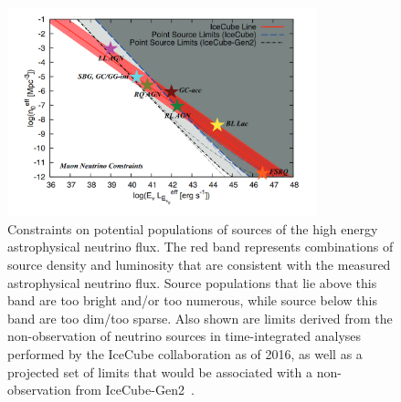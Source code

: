 \begin{figure}[h]
\centering
\includegraphics[width=0.8\textwidth]{figs/muraseplot.png}
\caption{Constraints on potential populations of sources of the high energy astrophysical neutrino flux. The red band represents combinations of source density and luminosity that are consistent with the measured astrophysical neutrino flux. Source populations that lie above this band are too bright and/or too numerous, while source below this band are too dim/too sparse. Also shown are limits derived from the non-observation of neutrino sources in time-integrated analyses performed by the IceCube collaboration as of 2016, as well as a projected set of limits that would be associated with a non-observation from IceCube-Gen2~\cite{Murase_constraints}. }
\label{fig:muraseplot}
\end{figure}

